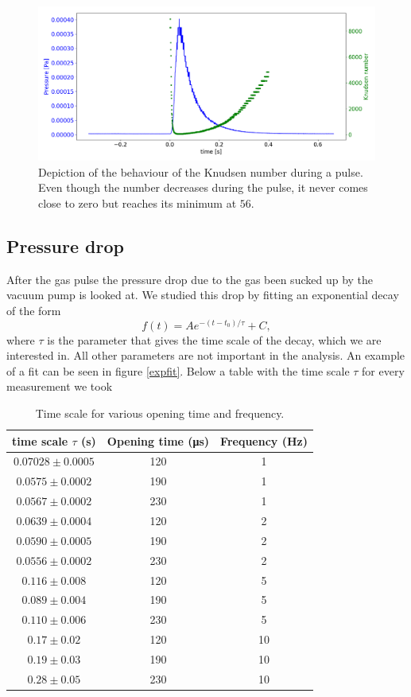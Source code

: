 \documentclass[a4paper,10pt]{article}
\begin{document}
\begin{figure}[H]
	\centering
	\includegraphics[width = \textwidth]{knudsen}
	\caption{Depiction of the behaviour of the Knudsen number during a pulse. Even though the number decreases during the pulse, it never comes close to zero but reaches its minimum at $56$. }
	\label{fig_knudsennumber}
\end{figure}

\subsection{Pressure drop}
After the gas pulse the pressure drop due to the gas been sucked up by the vacuum pump is looked at. We studied this drop by fitting an exponential decay of the form
\[f(t) = Ae^{-(t - t_0)/\tau} + C,\]
where $\tau$ is the parameter that gives the time scale of the decay, which we are interested in. All other parameters are not important in the analysis. An example of a fit can be seen in figure \ref{expfit}. Below a table with the time scale $\tau$ for every measurement we took
\begin{table}[H]
\centering
\begin{tabular}{ccc} \toprule
    time scale $\tau$ (s) & Opening time (\si{\micro \s}) & Frequency (\si{\hertz}) \\ \midrule
$0.07028 \pm 0.0005 $& 120& 1\\
$0.0575 \pm 0.0002$& 190& 1\\

$0.0567 \pm 0.0002$& 230& 1\\\midrule
$0.0639 \pm 0.0004$& 120& 2\\
$0.0590 \pm 0.0005$& 190& 2\\
$0.0556 \pm 0.0002 $& 230& 2\\ \midrule
$0.116 \pm 0.008$& 120& 5\\
$0.089 \pm 0.004$ & 190& 5\\ 
$0.110 \pm  0.006$ & 230& 5\\\midrule
$0.17 \pm  0.02$& 120& 10\\ 
$0.19 \pm 0.03$ & 190& 10\\
$0.28 \pm 0.05 $ & 230& 10\\ \bottomrule
\end{tabular}
\caption{Time scale for various opening time and frequency. }
\end{table}
\end{document}
